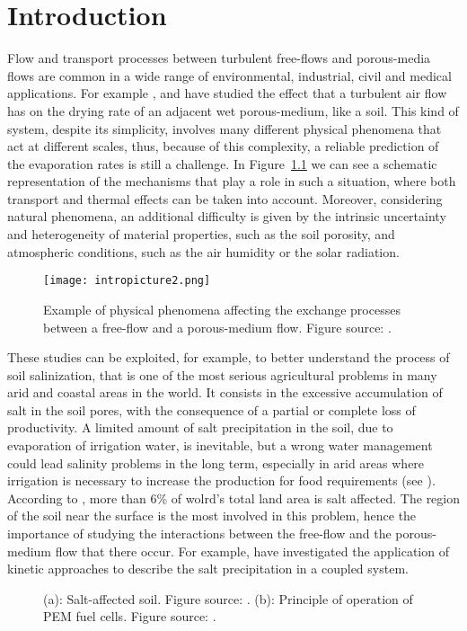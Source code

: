\chapter{Introduction}
Flow and transport processes between turbulent free-flows and porous-media 
flows are common in a wide range of environmental, industrial, civil and medical 
applications.
For example \textcite{tesi:mosthaf}, \textcite{intro:davarzani} and \textcite  {tesi:fetzer} have studied the effect that a turbulent air flow has on the 
drying rate of an adjacent wet porous-medium, like a soil. This kind of system, despite its simplicity, involves many different physical phenomena that act at different scales, thus, because of this complexity, a reliable prediction of the evaporation rates is still a challenge. In Figure~\ref{fig:intro} we can see a schematic representation of the mechanisms that play a role in such a situation, where both transport and thermal effects can be taken into account. Moreover, considering natural phenomena, an additional difficulty is given by the intrinsic uncertainty and heterogeneity of material properties, such as the soil porosity, and atmospheric conditions, such as the air humidity or the solar radiation.
\begin{figure}[ht]
	\centering
	\texttt{[image: intropicture2.png]}
	\caption[Exchange processes between free and porous-medium 
	flows]{Example of physical phenomena affecting the exchange processes 
		between a free-flow and a porous-medium flow. Figure source: 
		\cite{tesi:fetzer}.}
	\label{fig:intro}
\end{figure}

These studies can be exploited, for example, to better understand the process of soil salinization, that is one of the most serious agricultural problems in many arid and coastal areas in the world. It consists in the excessive accumulation of salt in the soil pores, with the consequence of a partial or complete loss of productivity. A limited amount of salt precipitation in the soil, due to evaporation of irrigation water, is inevitable, but a wrong water management could lead salinity problems in the long term, especially in arid areas where irrigation is necessary to increase the production for food requirements (see \cite{web:fao}). According to \cite{soil:munns}, more than 6\% of wolrd's total land area is salt affected.
The region of the soil near the surface is the most involved in this problem, hence the importance of studying the interactions between the free-flow and the porous-medium flow that there occur. For example, \textcite{intro:salinization} have investigated the application of kinetic approaches to describe the salt precipitation in a coupled system.
\begin{figure}
	\centering
	\caption{(a): Salt-affected soil. Figure source: \cite{web:fao}. (b): Principle of operation of PEM fuel cells. Figure source: \cite{intro:pemfig}.}
	\label{fig:intro2}
\end{figure}


